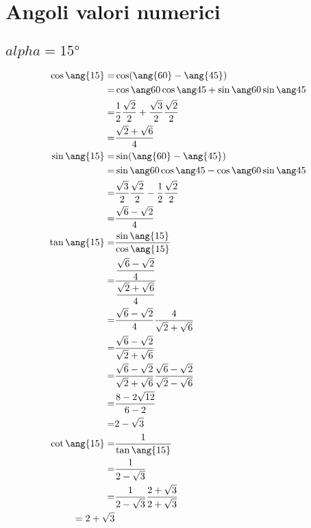 \chapter{Angoli valori numerici}\label{chap:Angoli_valori_numerici}
\section{$alpha=\ang{15}$}
\begin{align*}
	\cos\ang{15}=&\cos(\ang{60}-\ang{45})\\
	=&\difcos{60}{45}\\
	=&\cossessanta\cosquarantacinque+\sinsessanta\sinquarantecinque\\
	=&\dfrac{\sqrt{2}+\sqrt{6}}{4}\\
	\sin\ang{15}=&\sin(\ang{60}-\ang{45})\\
	=&\difsin{60}{45}\\
	=&\sinsessanta\cosquarantacinque-\cossessanta\sinquarantecinque\\
	=&\dfrac{\sqrt{6}-\sqrt{2}}{4}\\
	\tan\ang{15}=&\dfrac{\sin\ang{15}}{\cos\ang{15}}\\
	=&\dfrac{\dfrac{\sqrt{6}-\sqrt{2}}{4}}{\dfrac{\sqrt{2}+\sqrt{6}}{4}}\\
	=&\dfrac{\sqrt{6}-\sqrt{2}}{4}\dfrac{4}{\sqrt{2}+\sqrt{6}}\\
	=&\dfrac{\sqrt{6}-\sqrt{2}}{\sqrt{2}+\sqrt{6}}\\
	=&\dfrac{\sqrt{6}-\sqrt{2}}{\sqrt{2}+\sqrt{6}}\dfrac{\sqrt{6}-\sqrt{2}}{\sqrt{2}-\sqrt{6}}\\
	=&\dfrac{8-2\sqrt{12}}{6-2}\\
	=&2-\sqrt{3}\\
	\cot\ang{15}=&\dfrac{1}{\tan\ang{15}}\\
	=&\dfrac{1}{2-\sqrt{3}}\\
	=&\dfrac{1}{2-\sqrt{3}}\dfrac{2+\sqrt{3}}{2+\sqrt{3}}\\
	=2+\sqrt{3}\\
\end{align*}
